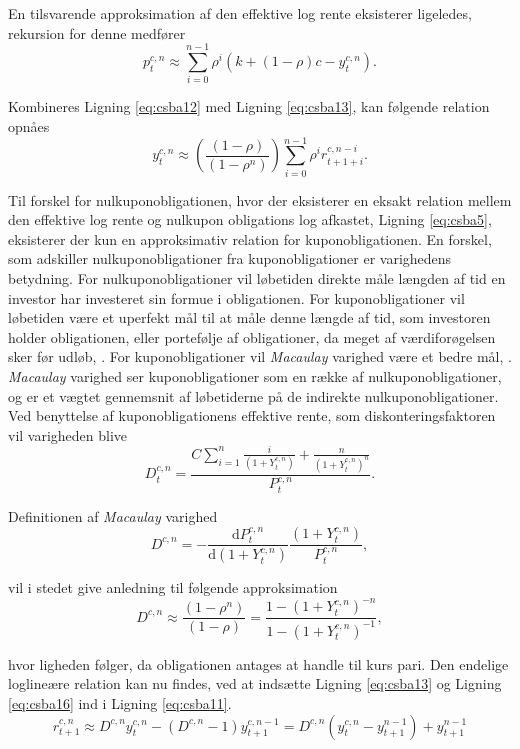 \documentclass[
  a4paper,
  oneside]{memoir}
\begin{document}
En tilsvarende approksimation af den effektive log rente eksisterer ligeledes, rekursion for denne medfører
\begin{equation}
p_t^{c,n}\approx\sum_{i=0}^{n-1} \rho^i (k+(1-\rho)c - y_{t}^{c,n}). \label{eq:csba13}
\end{equation}

Kombineres Ligning \eqref{eq:csba12} med Ligning \eqref{eq:csba13}, kan følgende relation opnåes
\begin{equation}
y_{t}^{c,n}\approx (\frac{(1-\rho)}{(1-\rho^n)})\sum_{i=0}^{n-1} \rho^i r_{t+1+i}^{c,n-i}. \label{eq:csba14}
\end{equation}

Til forskel for nulkuponobligationen, hvor der eksisterer en eksakt relation mellem den effektive log rente og nulkupon obligations log afkastet, Ligning \eqref{eq:csba5}, eksisterer der kun en approksimativ relation for kuponobligationen. En forskel, som adskiller nulkuponobligationer fra kuponobligationer er varighedens betydning. For nulkuponobligationer vil løbetiden direkte måle længden af tid en investor har investeret sin formue i obligationen. For kuponobligationer vil løbetiden være et uperfekt mål til at måle denne længde af tid, som investoren holder obligationen, eller portefølje af obligationer, da meget af værdiforøgelsen sker før udløb, \citep{Campbell1997}. For kuponobligationer vil \emph{Macaulay} varighed være et bedre mål, \citep{Macaulay1938}. \emph{Macaulay} varighed ser kuponobligationer som en række af nulkuponobligationer, og er et vægtet gennemsnit af løbetiderne på de indirekte nulkuponobligationer. Ved benyttelse af kuponobligationens effektive rente, som diskonteringsfaktoren vil varigheden blive
\begin{equation}
D_t^{c,n}=\frac{C\sum_{i=1}^n \frac{i}{(1+Y_t^{c,n})} + \frac{n}{(1+Y_t^{c,n})^n}}{P_t^{c,n}}. \label{eq:csba15}
\end{equation}

Definitionen af \emph{Macaulay} varighed
\[D^{c,n}=-\frac{\text{d} P_t^{c,n}}{\text{d} (1+Y_t^{c,n})}\frac{(1+Y_t^{c,n})}{P_t^{c,n}},\]

vil i stedet give anledning til følgende approksimation
\begin{equation}
D^{c,n}\approx \frac{(1-\rho^n)}{(1-\rho)} = \frac{1-(1+Y_t^{c,n})^{-n}}{1-(1+Y_t^{c,n})^{-1}}, \label{eq:csba16}
\end{equation}

hvor ligheden følger, da obligationen antages at handle til kurs pari. Den endelige loglineære relation kan nu findes, ved at indsætte Ligning \eqref{eq:csba13} og Ligning \eqref{eq:csba16} ind i Ligning \eqref{eq:csba11}.
\begin{equation}
r_{t+1}^{c,n}\approx D^{c,n} y_t^{c,n} - (D^{c,n} - 1) y_{t+1}^{c,n-1}=D^{c,n}(y_t^{c,n}- y_{t+1}^{n-1}) + y_{t+1}^{n-1}  \label{eq:csba17}
\end{equation}
\end{document}
